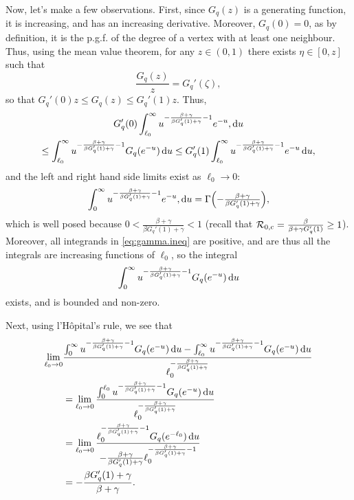 \documentclass[11pt]{article}
\newcommand{\R}{\mathcal{R}}
\newcommand{\Rzeroc}{\R_{\rm 0,c}}
\newcommand{\dee}{{\rm d}}
\begin{document}
Now, let's make a few observations.  First, since $G_{q}(z)$ is a generating function, it is increasing, and has an increasing derivative.  Moreover, $G_{q}(0) = 0$, as by definition, it is the p.g.f. of the degree of a vertex with at least one neighbour.  Thus, using the mean value theorem, for any $z \in (0,1)$ there exists $\eta \in [0,z]$ such that 
\begin{equation} 
	\frac{G_{q}(z)}{z} = G_{q}'(\zeta), 
\end{equation}
so that $G_{q}'(0) z \leq G_{q}(z) \leq G_{q}'(1) z$.  Thus, 
\begin{multline}\label{eq:gamma.ineq}
	G_{q}'(0) \int_{\ell_{0}}^{\infty} u^{-\frac{\beta+\gamma}{\beta G_{q}'(1)+\gamma}-1} e^{-u}, \dee u\\
	\leq \int_{\ell_{0}}^{\infty} u^{-\frac{\beta+\gamma}{\beta G_{q}'(1)+\gamma}-1} G_{q}(e^{-u})\, \dee u
	\leq G_{q}'(1) \int_{\ell_{0}}^{\infty} u^{-\frac{\beta+\gamma}{\beta G_{q}'(1)+\gamma}-1} e^{-u}\, \dee u,
\end{multline}
and the left and right hand side limits exist as $\ell_{0} \to 0$:
\begin{equation}
	\int_{0}^{\infty} u^{-\frac{\beta+\gamma}{\beta G_{q}'(1)+\gamma}-1} e^{-u}, \dee u = \Gamma{\textstyle \left(-\frac{\beta+\gamma}{\beta G_{q}'(1)+\gamma}\right)},
\end{equation}
which is well posed because $0 < \frac{\beta+\gamma}{\beta G_{q}'(1)+\gamma} < 1$ (recall that $\Rzeroc = \frac{\beta}{\beta+\gamma G_{q}'(1)} \geq 1$).  Moreover, all integrands in \eqref{eq:gamma.ineq} are positive, and are thus all the integrals are increasing functions of $\ell_{0}$, so the integral
\begin{equation}	
	\int_{0}^{\infty} u^{-\frac{\beta+\gamma}{\beta G_{q}'(1)+\gamma}-1} G_{q}(e^{-u})\, \dee u
\end{equation}
exists, and is bounded and non-zero.

Next, using l'H\^opital's rule, we see that 
\begin{subequations}
\begin{align}
	\lim_{\ell_{0} \to 0} &\frac{\int_{0}^{\infty} u^{-\frac{\beta+\gamma}{\beta G_{q}'(1)+\gamma}-1} G_{q}(e^{-u})\, \dee u
		-\int_{\ell_{0}}^{\infty} u^{-\frac{\beta+\gamma}{\beta G_{q}'(1)+\gamma}-1} G_{q}(e^{-u})\, \dee u}{\ell_{0}^{-\frac{\beta+\gamma}{\beta G_{q}'(1)+\gamma}}}\\
	&= \lim_{\ell_{0} \to 0} \frac{\int_{0}^{\ell_{0}} u^{-\frac{\beta+\gamma}{\beta G_{q}'(1)+\gamma}-1} G_{q}(e^{-u})\, \dee u}{\ell_{0}^{-\frac{\beta+\gamma}{\beta G_{q}'(1)+\gamma}}}\\
	&= \lim_{\ell_{0} \to 0} \frac{\ell_{0}^{-\frac{\beta+\gamma}{\beta G_{q}'(1)+\gamma}-1} G_{q}(e^{-\ell_{0}})\, \dee u}
		{-\frac{\beta+\gamma}{\beta G_{q}'(1)+\gamma}\ell_{0}^{-\frac{\beta+\gamma}{\beta G_{q}'(1)+\gamma}-1}}\\
	&= -\frac{\beta G_{q}'(1)+\gamma}{\beta+\gamma}.
\end{align}
\end{subequations}
\end{document}
